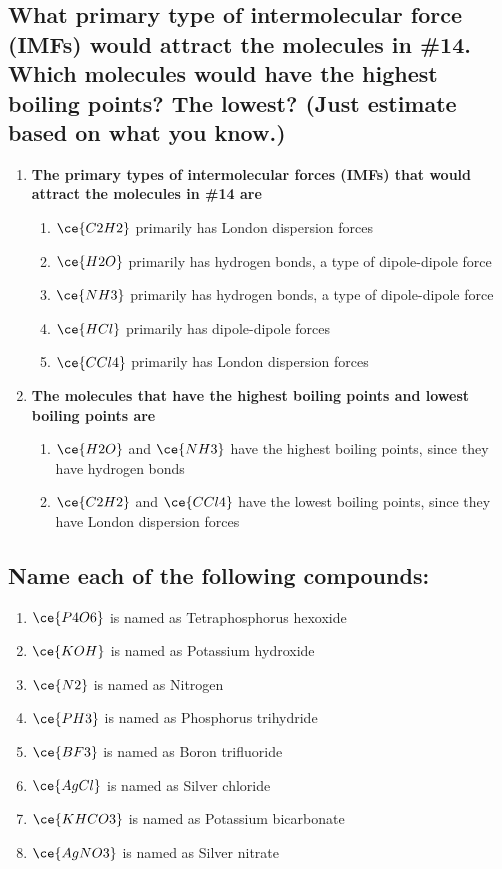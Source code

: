 \documentclass{scrartcl}
\begin{document}
\subsection{What primary type of intermolecular force (IMFs) would attract the molecules in \#14. Which molecules would have the highest boiling points? The lowest? (Just estimate based on what you know.)}
\label{sec:org0750987}
\begin{enumerate}
\item \textbf{The primary types of intermolecular forces (IMFs) that would attract the molecules in \#14 are}
\begin{enumerate}
\item \(\ce{C2H2}\) primarily has London dispersion forces
\item \(\ce{H2O}\) primarily has hydrogen bonds, a type of dipole-dipole force
\item \(\ce{NH3}\) primarily has hydrogen bonds, a type of dipole-dipole force
\item \(\ce{HCl}\) primarily has dipole-dipole forces
\item \(\ce{CCl4}\) primarily has London dispersion forces
\end{enumerate}
\item \textbf{The molecules that have the highest boiling points and lowest boiling points are}
\begin{enumerate}
\item \(\ce{H2O}\) and \(\ce{NH3}\)  have the highest boiling points, since they have hydrogen bonds
\item \(\ce{C2H2}\) and \(\ce{CCl4}\) have the lowest boiling points, since they have London dispersion forces
\end{enumerate}
\end{enumerate}

\subsection{Name each of the following compounds:}
\label{sec:org8690028}
\begin{enumerate}
\item \(\ce{P4O6}\) is named as Tetraphosphorus hexoxide
\item \(\ce{KOH}\) is named as Potassium hydroxide
\item \(\ce{N2}\) is named as Nitrogen
\item \(\ce{PH3}\) is named as Phosphorus trihydride
\item \(\ce{BF3}\) is named as Boron trifluoride
\item \(\ce{AgCl}\) is named as Silver chloride
\item \(\ce{KHCO3}\) is named as Potassium bicarbonate
\item \(\ce{AgNO3}\) is named as Silver nitrate
\end{enumerate}
\end{document}
